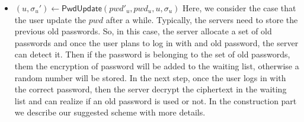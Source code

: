\begin{itemize}
	\item $ (u, \sigma_u')\gets \mathsf{PwdUpdate} (pwd'_u, pwd_u, u, \sigma_u)$ Here, we consider the case that the user update the $ pwd $ after a while. Typically, the servers need to store the previous old passwords. So, in this case, the server allocate a set of old passwords and once the user plans to log in with and old password, the server can detect it. Then if the password is belonging to the set of old passwords, them the encryption of password will be added to the waiting list, otherwise a random number will be stored. In the next step, once the user logs in with the correct password, then the server decrypt the ciphertext in the waiting list and can realize if an old password is used or not. In the construction part we describe our suggested scheme with more details.  
\end{itemize}



